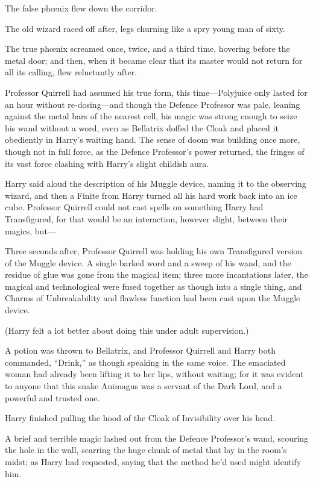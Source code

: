 The false phœnix flew down the corridor.

The old wizard raced off after, legs churning like a spry young man of sixty.

The true phœnix screamed once, twice, and a third time, hovering before the metal door; and then, when it became clear that its master would not return for all its calling, flew reluctantly after.

\later

Professor Quirrell had assumed his true form, this time—Polyjuice only lasted for an hour without re-dosing—and though the Defence Professor was pale, leaning against the metal bars of the nearest cell, his magic was strong enough to seize his wand without a word, even as Bellatrix doffed the Cloak and placed it obediently in Harry’s waiting hand. The sense of doom was building once more, though not in full force, as the Defence Professor’s power returned, the fringes of its vast force clashing with Harry’s slight childish aura.

Harry said aloud the description of his Muggle device, naming it to the observing wizard, and then a Finite from Harry turned all his hard work back into an ice cube. Professor Quirrell could not cast spells on something Harry had Transfigured, for that would be an interaction, however slight, between their magics, but—

Three seconds after, Professor Quirrell was holding his own Transfigured version of the Muggle device. A single barked word and a sweep of his wand, and the residue of glue was gone from the magical item; three more incantations later, the magical and technological were fused together as though into a single thing, and Charms of Unbreakability and flawless function had been cast upon the Muggle device.

(Harry felt a lot better about doing this under adult supervision.)

A potion was thrown to Bellatrix, and Professor Quirrell and Harry both commanded, “Drink,” as though speaking in the same voice. The emaciated woman had already been lifting it to her lips, without waiting; for it was evident to anyone that this snake Animagus was a servant of the Dark Lord, and a powerful and trusted one.

Harry finished pulling the hood of the Cloak of Invisibility over his head.

A brief and terrible magic lashed out from the Defence Professor’s wand, scouring the hole in the wall, scarring the huge chunk of metal that lay in the room’s midst; as Harry had requested, saying that the method he’d used might identify him.

